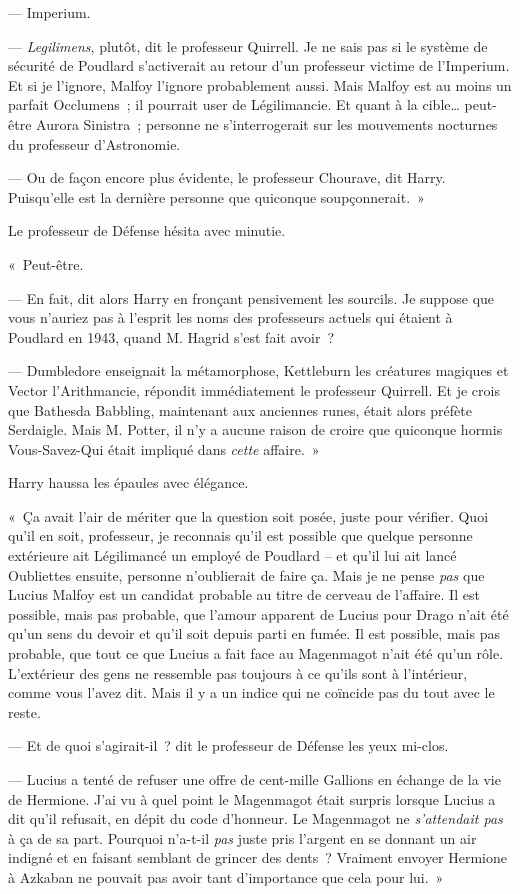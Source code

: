 --- Imperium.

--- \emph{Legilimens}, plutôt, dit le professeur Quirrell.
Je ne sais pas si le système de sécurité de Poudlard s'activerait au retour d'un professeur victime de l'Imperium.
Et si je l'ignore, Malfoy l'ignore probablement aussi.
Mais Malfoy est au moins un parfait Occlumens~; il pourrait user de Légilimancie.
Et quant à la cible… peut-être Aurora Sinistra~; personne ne s'interrogerait sur les mouvements nocturnes du professeur d'Astronomie.

--- Ou de façon encore plus évidente, le professeur Chourave, dit Harry.
Puisqu'elle est la dernière personne que quiconque soupçonnerait.~»

Le professeur de Défense hésita avec minutie.

«~Peut-être.

--- En fait, dit alors Harry en fronçant pensivement les sourcils.
Je suppose que vous n'auriez pas à l'esprit les noms des professeurs actuels qui étaient à Poudlard en 1943, quand M. Hagrid s'est fait avoir~?

--- Dumbledore enseignait la métamorphose, Kettleburn les créatures magiques et Vector l'Arithmancie, répondit immédiatement le professeur Quirrell.
Et je crois que Bathesda Babbling, maintenant aux anciennes runes, était alors préfète Serdaigle.
Mais M. Potter, il n'y a aucune raison de croire que quiconque hormis Vous-Savez-Qui était impliqué dans \emph{cette} affaire.~»

Harry haussa les épaules avec élégance.

«~Ça avait l'air de mériter que la question soit posée, juste pour vérifier.
Quoi qu'il en soit, professeur, je reconnais qu'il est possible que quelque personne extérieure ait Légilimancé un employé de Poudlard -- et qu'il lui ait lancé Oubliettes ensuite, personne n'oublierait de faire ça.
Mais je ne pense \emph{pas} que Lucius Malfoy est un candidat probable au titre de cerveau de l'affaire.
Il est possible, mais pas probable, que l'amour apparent de Lucius pour Drago n'ait été qu'un sens du devoir et qu'il soit depuis parti en fumée.
Il est possible, mais pas probable, que tout ce que Lucius a fait face au Magenmagot n'ait été qu'un rôle.
L'extérieur des gens ne ressemble pas toujours à ce qu'ils sont à l'intérieur, comme vous l'avez dit.
Mais il y a un indice qui ne coïncide pas du tout avec le reste.

--- Et de quoi s'agirait-il~? dit le professeur de Défense les yeux mi-clos.

--- Lucius a tenté de refuser une offre de cent-mille Gallions en échange de la vie de Hermione.
J'ai vu à quel point le Magenmagot était surpris lorsque Lucius a dit qu'il refusait, en dépit du code d'honneur.
Le Magenmagot ne \emph{s'attendait pas} à ça de sa part.
Pourquoi n'a-t-il \emph{pas} juste pris l'argent en se donnant un air indigné et en faisant semblant de grincer des dents~?
Vraiment envoyer Hermione à Azkaban ne pouvait pas avoir tant d'importance que cela pour lui.~»


